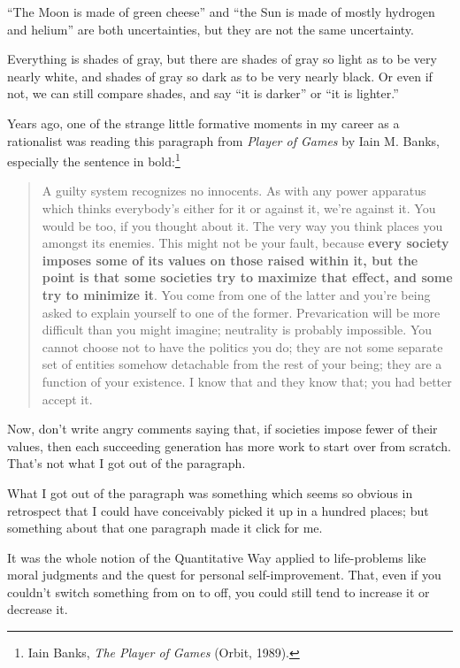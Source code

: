{
 ``The Moon is made of green
cheese'' and ``the Sun is made of
mostly hydrogen and helium'' are both uncertainties,
but they are not the same uncertainty.}

{
 Everything is shades of gray, but there are shades of gray so
light as to be very nearly white, and shades of gray so dark as to be
very nearly black. Or even if not, we can still compare shades, and say
``it is darker'' or
``it is lighter.''}

{
 Years ago, one of the strange little formative moments in my
career as a rationalist was reading this paragraph from \textit{Player
of Games} by Iain M. Banks, especially the sentence in
bold:\footnote{Iain Banks, \textit{The Player of Games} (Orbit, 1989).}}

\begin{quote}
{
 A guilty system recognizes no innocents. As with any power
apparatus which thinks everybody's either for it or
against it, we're against it. You would be too, if you
thought about it. The very way you think places you amongst its
enemies. This might not be your fault, because \textbf{every society
imposes some of its values on those raised within it, but the point is
that some societies try to maximize that effect, and some try to
minimize it}. You come from one of the latter and
you're being asked to explain yourself to one of the
former. Prevarication will be more difficult than you might imagine;
neutrality is probably impossible. You cannot choose not to have the
politics you do; they are not some separate set of entities somehow
detachable from the rest of your being; they are a function of your
existence. I know that and they know that; you had better accept it.}
\end{quote}

{
 Now, don't write angry comments saying that, if
societies impose fewer of their values, then each succeeding generation
has more work to start over from scratch. That's not
what I got out of the paragraph.}

{
 What I got out of the paragraph was something which seems so
obvious in retrospect that I could have conceivably picked it up in a
hundred places; but something about that one paragraph made it click
for me.}

{
 It was the whole notion of the Quantitative Way applied to
life-problems like moral judgments and the quest for personal
self-improvement. That, even if you couldn't switch
something from on to off, you could still tend to increase it or
decrease it.}

